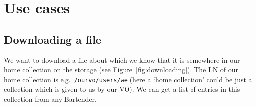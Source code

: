 \documentclass{book}
\begin{document}

\chapter{Use cases} %
\label{cha:use_cases}

\section{Downloading a file} %
\label{sec:downloading_a_file}
\begin{figure}[ht]
\end{figure}

We want to download a file about which we know that it is somewhere in our home collection on the storage (see Figure~\ref{fig:downloading}). The LN of our home collection is e.g.~\verb#/ourvo/users/we# (here a `home collection' could be just a collection which is given to us by our VO). We can get a list of entries in this collection from any Bartender.
\end{document}
